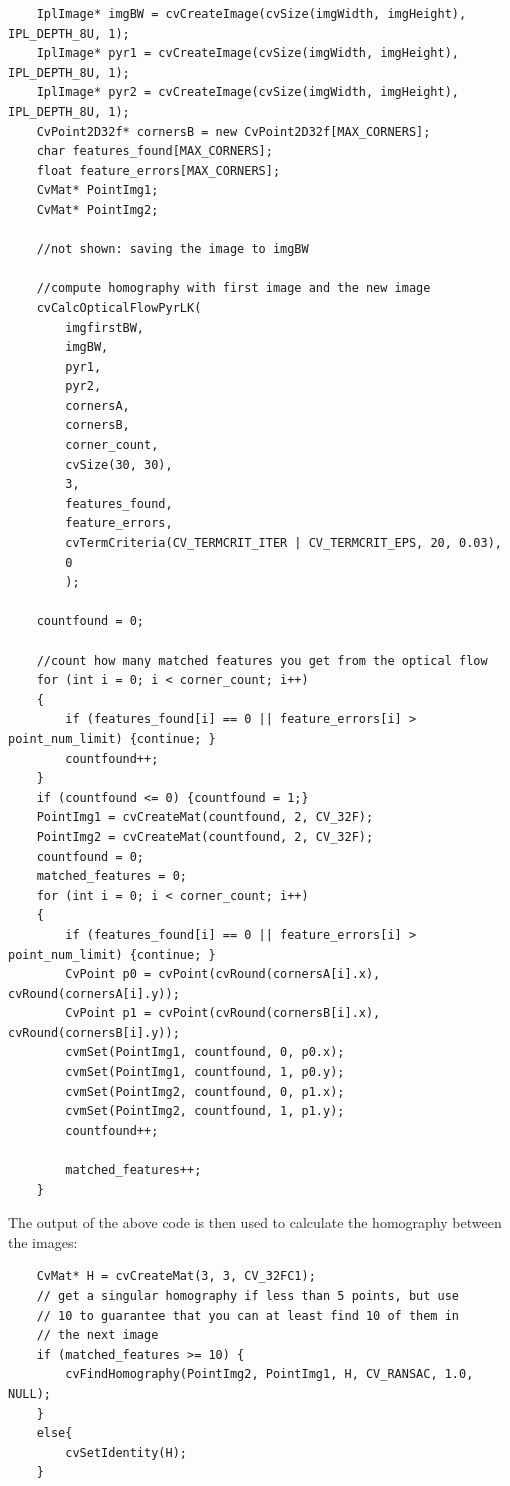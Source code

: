 \documentclass{article}
\begin{document}
\begin{verbatim}
    IplImage* imgBW = cvCreateImage(cvSize(imgWidth, imgHeight), IPL_DEPTH_8U, 1);
    IplImage* pyr1 = cvCreateImage(cvSize(imgWidth, imgHeight), IPL_DEPTH_8U, 1);
    IplImage* pyr2 = cvCreateImage(cvSize(imgWidth, imgHeight), IPL_DEPTH_8U, 1);
    CvPoint2D32f* cornersB = new CvPoint2D32f[MAX_CORNERS];
    char features_found[MAX_CORNERS];
    float feature_errors[MAX_CORNERS];    
    CvMat* PointImg1;
    CvMat* PointImg2;

    //not shown: saving the image to imgBW

    //compute homography with first image and the new image
    cvCalcOpticalFlowPyrLK(
        imgfirstBW, 
        imgBW,
        pyr1,
        pyr2,
        cornersA,
        cornersB,
        corner_count,
        cvSize(30, 30),
        3, 
        features_found,
        feature_errors,
        cvTermCriteria(CV_TERMCRIT_ITER | CV_TERMCRIT_EPS, 20, 0.03),
        0 
        );
            
    countfound = 0;
    
    //count how many matched features you get from the optical flow
    for (int i = 0; i < corner_count; i++)
    {
        if (features_found[i] == 0 || feature_errors[i] > point_num_limit) {continue; }
        countfound++;
    }
    if (countfound <= 0) {countfound = 1;}
    PointImg1 = cvCreateMat(countfound, 2, CV_32F);
    PointImg2 = cvCreateMat(countfound, 2, CV_32F);
    countfound = 0;
    matched_features = 0;
    for (int i = 0; i < corner_count; i++)
    {
        if (features_found[i] == 0 || feature_errors[i] > point_num_limit) {continue; }
        CvPoint p0 = cvPoint(cvRound(cornersA[i].x), cvRound(cornersA[i].y));
        CvPoint p1 = cvPoint(cvRound(cornersB[i].x), cvRound(cornersB[i].y));
        cvmSet(PointImg1, countfound, 0, p0.x);
        cvmSet(PointImg1, countfound, 1, p0.y);
        cvmSet(PointImg2, countfound, 0, p1.x);
        cvmSet(PointImg2, countfound, 1, p1.y);
        countfound++;

        matched_features++;
    }
\end{verbatim}  

The output of the above code is then used to calculate the homography between
the images:

\begin{verbatim}
    CvMat* H = cvCreateMat(3, 3, CV_32FC1);
    // get a singular homography if less than 5 points, but use
    // 10 to guarantee that you can at least find 10 of them in
    // the next image    
    if (matched_features >= 10) {
        cvFindHomography(PointImg2, PointImg1, H, CV_RANSAC, 1.0, NULL);
    }
    else{
        cvSetIdentity(H);
    }
\end{verbatim}
\end{document}

